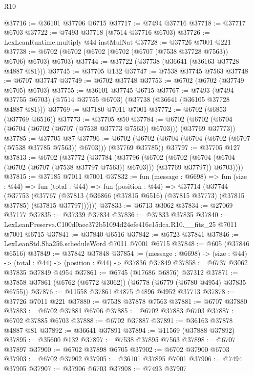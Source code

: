 \begin{lexlean}{R10}
\begin{coremodule}
@37716 := @36101 @37706 @6715
@37717 := @7494 @37716
@37718 := @37717 @6703
@37722 := @7493 @37718 (@7514 @37716 @6703)
@37726 := LexLeanRuntime.multiply @44 instMulNat
@37728 := @37726 @7001 @221
@37738 := @6702 (@6702 (@6702 (@6702 (@6707 (@7538 @37728 @7563)) @6706) @6703) @6703)
@37744 := @37722 (@37738 (@36641 (@36163 @37728 @4887 @81)))
@37745 := @37705 @132
@37747 := @7538 @37745 @7563
@37748 := @6707 @37747
@37749 := @6702 @37748
@37753 := @6702 (@6702 (@37749 @6705) @6703)
@37755 := @36101 @37745 @6715
@37767 := @7493
    (@7494 @37755 @6703)
    (@7514 @37755 @6703)
    (@37738 (@36641 (@36105 @37728 @4887 @81)))
@37769 := @37180 @7011 @7001
@37772 := @6702 (@6853 (@37769 @6516))
@37773 := @37705 @50
@37784 := @6702 (@6702 (@6704 (@6704 (@6702 (@6707 (@7538 @37773 @7563)) @6703))) (@37769 @37773))
@37785 := @37705 @87
@37796 := @6702 (@6702 (@6704 (@6704 (@6702 (@6707 (@7538 @37785 @7563)) @6703))) (@37769 @37785))
@37797 := @37705 @127
@37813 := @6702
    (@37772
      (@37784
        (@37796
          (@6702
            (@6702 (@6704 (@6704 (@6702 (@6707 (@7538 @37797 @7563)) @6703))) (@37769 @37797))
            @6703))))
@37815 := @37185 @7011 @7001
@37832 := fun (message : @6698) =>
  fun (size : @44) =>
  fun (total : @44) =>
  fun (position : @44) =>
  @37714
    (@37744
      (@37753
        (@37767 (@37813 (@36866 (@37815 @6516) (@37815 @37773) (@37815 @37785) (@37815 @37797))))))
@37833 := @6713 @3062
@37834 := @27069 @37177
@37835 := @37339 @37834
@37836 := @37833 @37835
@37840 := LexLeanPreserve.C100d0aec372b51094d24efe416e15dca.R10.__fits_25 @7011 @7001 @6715
@37841 := @37840 @6516
@37842 := @6723 @37841
@37846 := LexLeanStd.Sha256.scheduleWord @7011 @7001 @6715
@37848 := @605 (@37846 @6516)
@37849 := @37842 @37848
@37854 := (message : @6698) -> (size : @44) -> (total : @44) -> (position : @44) -> @37836 @37849
@37858 := @6737 @3062 @37835 @37849 @4954
@37861 := @6745 (@17686 @6876) @37312
@37871 := @37858 @37861 (@6762 (@6772 @3062)) (@6778 (@6779 (@6780 @4954) @37835 @6755))
@37876 := @11558 @37861 @4875 @4896 @4952 @37713
@37878 := @37726 @7011 @221
@37880 := @7538 @37878 @7563
@37881 := @6707 @37880
@37883 := @6702 @37881 @6706
@37885 := @6702 @37883 @6703
@37887 := @6702 @37885 @6703
@37888 := @6702 @37887
@37891 := @36163 @37878 @4887 @81
@37892 := @36641 @37891
@37894 := @11569 (@37888 @37892)
@37895 := @35600 @132
@37897 := @7538 @37895 @7563
@37898 := @6707 @37897
@37900 := @6702 @37898 @6705
@37902 := @6702 @37900 @6703
@37903 := @6702 @37902
@37905 := @36101 @37895 @7001
@37906 := @7494 @37905
@37907 := @37906 @6703
@37908 := @7493 @37907

\end{coremodule}
\end{lexlean}
